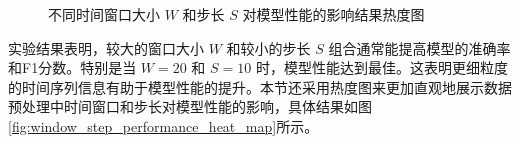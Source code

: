 \begin{figure}[htbp]
    \ContinuedFloat
	\centering
    \caption{不同时间窗口大小 $W$ 和步长 $S$ 对模型性能的影响结果热度图}
    \label{fig:window_step_performance_heat_map}
\end{figure}

实验结果表明，较大的窗口大小 \( W \) 和较小的步长 \( S \) 组合通常能提高模型的准确率和F1分数。特别是当 \( W = 20 \) 和 \( S = 10 \) 时，模型性能达到最佳。这表明更细粒度的时间序列信息有助于模型性能的提升。本节还采用热度图来更加直观地展示数据预处理中时间窗口和步长对模型性能的影响，具体结果如图\eqref{fig:window_step_performance_heat_map}所示。



